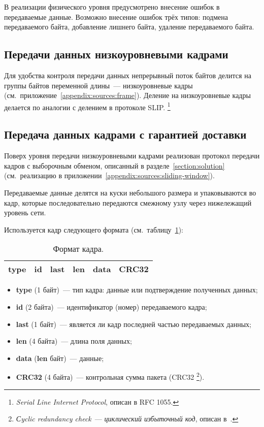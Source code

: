 \documentclass[a4paper,10pt]{article}
\begin{document}
В реализации физического уровня предусмотрено внесение ошибок в передаваемые данные.
Возможно внесение ошибок трёх типов: подмена передаваемого байта, 
добавление лишнего байта, удаление передаваемого байта.

\subsection{Передачи данных низкоуровневыми кадрами}
Для удобства контроля передачи данных 
непрерывный поток байтов делится на группы байтов переменной длины~--- 
низкоуровневые кадры
(см.~приложение~\ref{appendix:sources:frame}).
Деление на низкоуровневые кадры делается по аналогии с делением в протоколе SLIP.%
\footnote{\textit{Serial Line Internet Protocol}, описан в RFC 1055.}

\subsection{Передача данных кадрами с гарантией доставки}
Поверх уровня передачи низкоуровневыми кадрами 
реализован протокол передачи кадров с выборочным обменом,
описанный в разделе~\ref{section:solution} 
(см.~реализацию в приложении~\ref{appendix:sources:sliding-window}).

Передаваемые данные делятся на куски небольшого размера и 
упаковываются во кадр,
которые последовательно передаются смежному узлу через 
нижележащий уровень сети.

Используется кадр следующего формата (см.~таблицу~\ref{table:frame}):
\begin{table}[h]
  \begin{center}
    \begin{tabular}{|c|c|c|c|c|c|}
      \hline
      type & id & last & len & data & CRC32 \\
      \hline
    \end{tabular}
  \end{center}
  \caption{Формат кадра.}
  \label{table:frame}
\end{table}
\begin{itemize}
  \item \textbf{type} (1 байт)~--- 
  тип кадра: данные или подтверждение полученных данных;
  \item \textbf{id} (2 байта)~--- 
  идентификатор (номер) передаваемого кадра;
  \item \textbf{last} (1 байт)~--- 
  является ли кадр последней частью передаваемых данных;
  \item \textbf{len} (4 байта)~--- длина поля данных;
  \item \textbf{data} (\textbf{len} байт)~--- данные;
  \item \textbf{CRC32} (4 байта)~--- контрольная сумма пакета (CRC32%
\footnote{\textit{Сyclic redundancy check}~--- \textit{циклический избыточный код}, %
описан в~\cite{peterson1961crc}.%
}).
\end{itemize}
\end{document}
